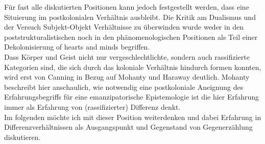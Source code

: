 \noindent Für fast alle diskutierten Positionen kann jedoch festgestellt werden, dass
eine Situierung im postkolonialen Verhältnis ausbleibt. Die Kritik am Dualismus
und der Versuch Subjekt-Objekt Verhältnisse zu überwinden wurde weder in den
poststrukturalistischen noch in den phänomenologischen Positionen als Teil
einer Dekolonisierung \glqq of hearts and minds \grqq begriffen.\\
Dass Körper und Geist
nicht nur vergeschlechtlichte, sondern auch rassifizierte Kategorien sind, die
sich durch das koloniale Verhältnis hindurch formen konnten, wird erst von
Canning in Bezug auf Mohanty und Haraway deutlich. Mohanty beschreibt hier
anschaulich, wie notwendig eine postkoloniale Aneignung des Erfahrungsbegriffs
für eine emanzipatorische Epistemologie ist die hier Erfahrung immer als
Erfahrung von (rassifizierter) Differenz denkt.\\

\indent Im folgenden möchte ich mit dieser Position weiterdenken und dabei Erfahrung in
Differenzverhältnissen als Ausgangspunkt und Gegenstand von Gegenerzählung diskutieren.
